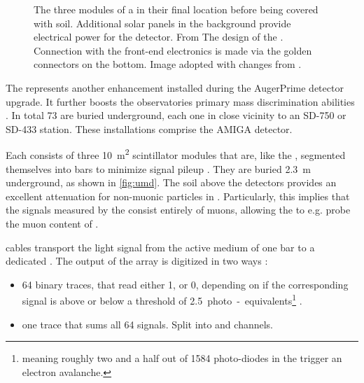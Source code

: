 \begin{figure}[t]
  \centering
  \hspace{0.2cm}
  \caption[]{The three modules of a \UMD in their final location
  before being covered with soil. Additional solar panels in the background
  provide electrical power for the detector. From 
  \cite{pierreaugercollaborationUMDUndergroundMuon}  The \PCB
  design of the \UUB. Connection with the front-end electronics is made via the
  golden connectors on the bottom. Image adopted with changes from 
\cite{nitzNewElectronicsSurface2021}.}
  \label{fig:umd-and-uub}
\end{figure}


The \UMD represents another enhancement installed during the AugerPrime detector
upgrade. It further boosts the observatories primary mass discrimination 
abilities \cite{collaborationPierreAugerObservatory2016}. In total 73 \UMDs are
buried underground, each one in close vicinity to an SD-750 or SD-433 station. 
These installations comprise the \acf{AMIGA} detector.

Each \UMD consists of three \SI{10}{\meter\squared} scintillator modules that 
are, like the \SSD, segmented themselves into bars to minimize signal pileup
\cite{bottiStatusPerformanceUnderground2022}. They are buried \SI{2.3}{\meter} 
underground, as shown in \cref{fig:umd}. The soil above the detectors provides 
an excellent attenuation for non-muonic particles in \EASs. Particularly, this 
implies that the signals measured by the \UMD consist entirely of muons, 
allowing the \PAO to e.g. probe the muon content of \EASs {}.

\WLS cables transport the light signal from the active medium of one bar to a 
dedicated \SiPM. The output of the \SiPM array is digitized in two ways 
\cite{aabCalibrationUndergroundMuon2021}:

\begin{itemize}
	\item 64 binary traces, that read either 1, or 0, depending on if the 
	corresponding \SiPM signal is above or below a threshold of 
	\SI{2.5}{photo-equivalents}\footnote{meaning roughly two and a half
	out of 1584 photo-diodes in the \SiPM trigger an electron avalanche.}
	\cite{bottiStatusPerformanceUnderground2022}.
	\item one \ADC trace that sums all 64 \SiPM signals. Split into \HG and
	\LG channels.
\end{itemize}

